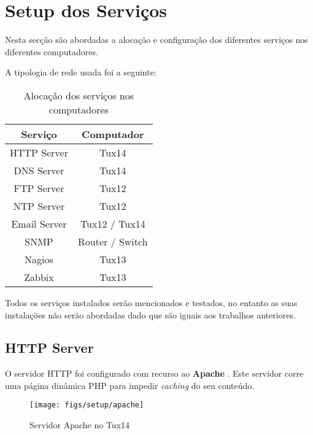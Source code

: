 \chapter{Setup dos Serviços}

Nesta secção são abordadas a alocação e configuração dos diferentes serviços nos diferentes computadores.

A tipologia de rede usada foi a seguinte:

\begin{table}[H]
    \begin{center}
        \begin{tabular}{ || c | c ||}
        \hline
        \textbf{Serviço} & \textbf{Computador}\\ 
        \hline
        HTTP Server & Tux14\\ 
        \hline
        DNS Server & Tux14\\ 
        \hline
        FTP Server & Tux12\\ 
        \hline
        NTP Server & Tux12\\ 
        \hline
        Email Server & Tux12 / Tux14\\ 
        \hline
        SNMP & Router / Switch\\ 
        \hline
        Nagios & Tux13\\
        \hline
        Zabbix & Tux13\\
        \hline
        \end{tabular}
    \end{center}
    \caption{Alocação dos serviços nos computadores}
    \label{tab:ip_table}
\end{table}

Todos os serviços instalados serão mencionados e testados, no entanto as suas instalações não serão abordadas dado que são iguais aos trabalhos anteriores.


\section{HTTP Server}

O servidor HTTP foi configurado com recurso ao \textbf{Apache} \cite{Apache}.
Este servidor corre uma página dinâmica PHP para impedir \textit{caching} do seu conteúdo.

\begin{figure}[H]
    \centering
    \texttt{[image: figs/setup/apache]}
    \caption{Servidor Apache no Tux14}
    \label{fig:apache_setup}
\end{figure}

